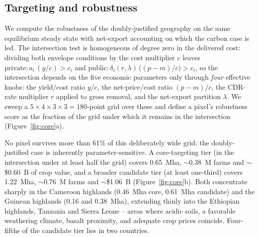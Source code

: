 \documentclass[12pt]{article}
\begin{document}
\subsection{Targeting and robustness}\label{sec:robust}
We compute the robustness of the doubly-justified geography on the same
equilibrium steady state with net-export accounting on which the carbon case is
led. The intersection test is homogeneous of degree zero in the delivered cost:
dividing both envelope conditions by the cost multiplier $c$ leaves
$\text{private}: a_i\,(y/c) > c_i$ and
$\text{public}: \delta_i(r,\lambda)\,\bigl((p-m)/c\bigr) > c_i$, so the
intersection depends on the five economic parameters only through \emph{four}
effective knobs: the yield/cost ratio $y/c$, the net-price/cost ratio $(p-m)/c$,
the CDR-rate multiplier $r$ applied to gross removal, and the net-export partition
$\lambda$. We sweep a $5\times4\times3\times3 = 180$-point grid over these and
define a pixel's robustness score as the fraction of the grid under which it
remains in the intersection (Figure~\ref{fig:core}a).

No pixel survives more than 61\% of this deliberately wide grid: the
doubly-justified case is inherently parameter-sensitive. A core-targeting tier
(in the intersection under at least half the grid) covers 0.65~Mha,
\(\sim\)0.38~M farms and \(\sim\)\$0.60~B of crop value, and a broader candidate
tier (at least one-third) covers 1.22~Mha, \(\sim\)0.76~M farms and
\(\sim\)\$1.06~B (Figure~\ref{fig:core}b). Both concentrate sharply in the
Cameroon highlands (0.46~Mha core, 0.61~Mha candidate) and the Guinean highlands
(0.16 and 0.38~Mha), extending thinly into the Ethiopian highlands, Tanzania and
Sierra Leone -- areas where acidic soils, a favorable weathering climate, basalt
proximity, and adequate crop prices coincide. Four-fifths of the candidate tier
lies in two countries.
\end{document}
